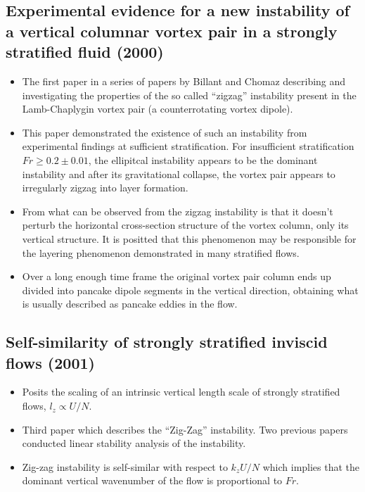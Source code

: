 \documentclass{article}
\begin{document}
    \subsection{Experimental evidence for a new instability of a
    vertical columnar vortex pair in a strongly
    stratified fluid (2000)}
    \begin{itemize}
        \item The first paper in a series of papers by Billant and Chomaz describing
        and investigating the properties of the so called ``zigzag'' instability
        present in the Lamb-Chaplygin vortex pair (a counterrotating vortex dipole). 
        \item This paper demonstrated the existence of such an instability from
        experimental findings at sufficient stratification. For insufficient
        stratification $Fr \ge 0.2 \pm 0.01$, the ellipitcal instability appears to
        be the dominant instability and after its gravitational collapse, the vortex
        pair appears to irregularly zigzag into layer formation. 
        \item From what can be observed from the zigzag instability is that it
        doesn't perturb the horizontal cross-section structure of the vortex column,
        only its vertical structure. It is positted that this phenomenon may be
        responsible for the layering phenomenon demonstrated in many stratified
        flows. 
        \item Over a long enough time frame the original vortex pair column ends up
        divided into pancake dipole segments in the vertical direction, obtaining
        what is usually described as pancake eddies in the flow. 
    \end{itemize}

    \subsection{Self-similarity of strongly stratified inviscid flows (2001)}

    \begin{itemize}
        \item Posits the scaling of an intrinsic vertical length scale of strongly
        stratified flows, $l_z \propto U/N$. 
        \item Third paper which describes the ``Zig-Zag'' instability. Two previous
        papers conducted linear stability analysis of the instability. 
        \item Zig-zag instability is self-similar with respect to $k_zU/N$ which
        implies that the dominant vertical wavenumber of the flow is proportional to
        $Fr$. 
    \end{itemize}
\end{document}
